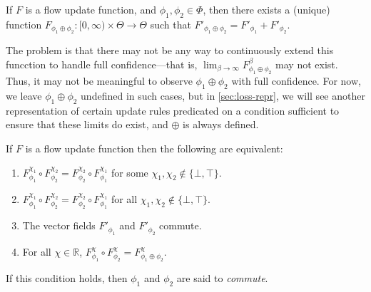 \begin{prop}
	If $F$ is a flow update function, and $\phi_1, \phi_2 \in \Phi$,
	then there exists a (unique) function
	$F_{\phi_1 \oplus \phi_2}
	 	: [0, \infty) \times \Theta \to \Theta$
	such that
	$F'_{\phi_1 \oplus \phi_2} = F'_{\phi_1} + F'_{\phi_2}$.
\end{prop}
%
The problem is that there may not be any way to continuously extend
this funcction to handle full confidence---that is,
$\lim_{\beta \to \infty} F^{\beta}_{\phi_1 \oplus \phi_2}$ may not exist.
Thus, it may not be meaningful to observe $\phi_1 \oplus \phi_2$ with full confidence.
For now, we leave $\phi_1 \oplus \phi_2$ undefined in such cases,
but in \cref{sec:loss-repr}, we will see another representation
of certain update rules predicated on a condition sufficient
to ensure that these limits do exist, and $\oplus$ is always defined.


\begin{prop}
	If $F$ is a flow update function
	then the following are equivalent:
	\begin{enumerate}
		\item $F_{\phi_1}^{\chi_1} \circ F_{\phi_2}^{\chi_2} =  F_{\phi_2}^{\chi_2} \circ F_{\phi_1}^{\chi_1}$
		for some $\chi_1, \chi_2 \notin \{\bot,\top\}$.
		\item $F_{\phi_1}^{\chi_1} \circ F_{\phi_2}^{\chi_2} =  F_{\phi_2}^{\chi_2} \circ F_{\phi_1}^{\chi_1}$
		for all $\chi_1, \chi_2 \notin \{\bot,\top\}$.

		\item The vector fields $F'_{\phi_1}$ and $F'_{\phi_2}$ commute.

		\item
			For all $\chi \in \mathbb R$, 
			$F^{\chi}_{\phi_1} \circ F^{\chi}_{\phi_2} = F^\chi_{\phi_1\oplus\phi_2}$.
	\end{enumerate}
	If this condition holds, then $\phi_1$ and $\phi_2$ are said to \emph{commute}.
\end{prop}

